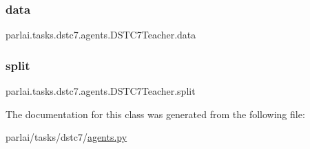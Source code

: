 \subsubsection{\texorpdfstring{data}{data}}
{\footnotesize\ttfamily parlai.\+tasks.\+dstc7.\+agents.\+D\+S\+T\+C7\+Teacher.\+data}

\mbox{\label{classparlai_1_1tasks_1_1dstc7_1_1agents_1_1DSTC7Teacher_a441e080f8a4514fb9c3b8a1872dea4e3}} 
\subsubsection{\texorpdfstring{split}{split}}
{\footnotesize\ttfamily parlai.\+tasks.\+dstc7.\+agents.\+D\+S\+T\+C7\+Teacher.\+split}



The documentation for this class was generated from the following file\+:\begin{DoxyCompactItemize}
\item 
parlai/tasks/dstc7/\hyperlink{parlai_2tasks_2dstc7_2agents_8py}{agents.\+py}\end{DoxyCompactItemize}
